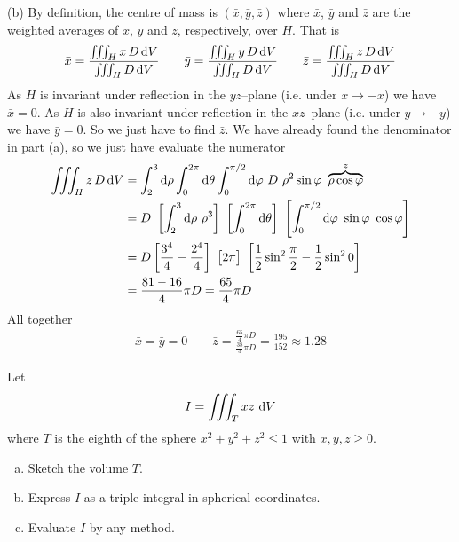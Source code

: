 \begin{solution}
(b) By definition, the centre of mass is $(\bar x,\bar y,\bar z)$
where $\bar x$, $\bar y$ and $\bar z$ are the weighted averages of
$x$, $y$ and $z$, respectively, over $H$. That is
\begin{align*}
\bar x =\frac{\iiint_H x\,D\,\mathrm{d}V}{\iiint_H D\,\mathrm{d}V}\qquad
\bar y =\frac{\iiint_H y\,D\,\mathrm{d}V}{\iiint_H D\,\mathrm{d}V}\qquad
\bar z =\frac{\iiint_H z\,D\,\mathrm{d}V}{\iiint_H D\,\mathrm{d}V}
\end{align*}
As $H$ is invariant under reflection in the $yz$--plane (i.e. under
$x\rightarrow-x$) we have $\bar x=0$.
As $H$ is also invariant under reflection in the $xz$--plane (i.e. under
$y\rightarrow-y$) we have $\bar y=0$.
So we just have to find $\bar z$. We have already found the denominator in part 
(a), so we just have evaluate the numerator
\begin{align*}
\tripInt_H z\,D\,\dee{V}
&=\int_2^3\dee{\rho} \int_0^{2\pi}\dee{\theta}\int_0^{\pi/2}\dee{\varphi}\ 
           D\ \rho^2\sin\varphi\ \overbrace{\rho\cos\varphi}^{z} \\
&=D\ \left[\int_2^3\dee{\rho}\ \rho^3\right]\ 
     \left[\int_0^{2\pi}\dee{\theta}\right]\ 
     \left[\int_0^{\pi/2}\dee{\varphi}\ \sin\varphi\ \cos\varphi\right] \\
&= D\left[\frac{3^4}{4}-\frac{2^4}{4}\right]\ 
     \big[2\pi\big]\ 
     \left[\frac{1}{2}\sin^2\frac{\pi}{2} -\frac{1}{2}\sin^2 0\right] \\
&=\frac{81-16}{4}\pi D
=\frac{65}{4}\pi D
\end{align*}
All together
\begin{align*}
\bar x = \bar y=0\qquad
\bar z =\frac{\frac{65}{4}\pi D}{\frac{38}{3}\pi D}
       =\frac{195}{152}
       \approx 1.28
\end{align*}
\end{solution}

\begin{question}[M200 2008D] %
Let
\begin{equation*}
I = \iiint_T xz\ \mathrm{d}V
\end{equation*}
where $T$ is the eighth of the sphere $x^2 + y^2 + z^2 \le 1$ with 
$x,y,z \ge 0$.
\begin{enumerate}[(a)]
\item
Sketch the volume $T$.

\item
Express $I$ as a triple integral in spherical coordinates.

\item
Evaluate $I$ by any method.

\end{enumerate}
\end{question}

